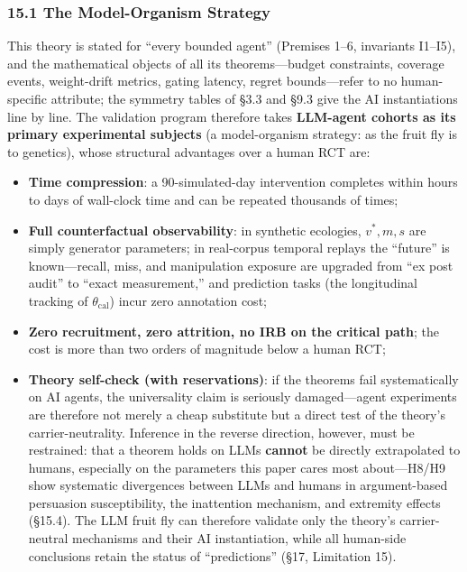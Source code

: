 \documentclass[
  11pt]{article}
\providecommand{\tightlist}{%
  \setlength{\itemsep}{0pt}\setlength{\parskip}{0pt}}
\begin{document}
\subsubsection{15.1 The Model-Organism
Strategy}\label{the-model-organism-strategy}

This theory is stated for ``every bounded agent'' (Premises 1--6,
invariants I1--I5), and the mathematical objects of all its
theorems---budget constraints, coverage events, weight-drift metrics,
gating latency, regret bounds---refer to no human-specific attribute;
the symmetry tables of §3.3 and §9.3 give the AI instantiations line by
line. The validation program therefore takes \textbf{LLM-agent cohorts
as its primary experimental subjects} (a model-organism strategy: as the
fruit fly is to genetics), whose structural advantages over a human RCT
are:

\begin{itemize}
\tightlist
\item
  \textbf{Time compression}: a 90-simulated-day intervention completes
  within hours to days of wall-clock time and can be repeated thousands
  of times;
\item
  \textbf{Full counterfactual observability}: in synthetic ecologies,
  \(v^*, m, s\) are simply generator parameters; in real-corpus temporal
  replays the ``future'' is known---recall, miss, and manipulation
  exposure are upgraded from ``ex post audit'' to ``exact measurement,''
  and prediction tasks (the longitudinal tracking of
  \(\theta_{\mathrm{cal}}\)) incur zero annotation cost;
\item
  \textbf{Zero recruitment, zero attrition, no IRB on the critical
  path}; the cost is more than two orders of magnitude below a human
  RCT;
\item
  \textbf{Theory self-check (with reservations)}: if the theorems fail
  systematically on AI agents, the universality claim is seriously
  damaged---agent experiments are therefore not merely a cheap
  substitute but a direct test of the theory's carrier-neutrality.
  Inference in the reverse direction, however, must be restrained: that
  a theorem holds on LLMs \textbf{cannot} be directly extrapolated to
  humans, especially on the parameters this paper cares most
  about---H8/H9 show systematic divergences between LLMs and humans in
  argument-based persuasion susceptibility, the inattention mechanism,
  and extremity effects (§15.4). The LLM fruit fly can therefore
  validate only the theory's carrier-neutral mechanisms and their AI
  instantiation, while all human-side conclusions retain the status of
  ``predictions'' (§17, Limitation 15).
\end{itemize}
\end{document}
